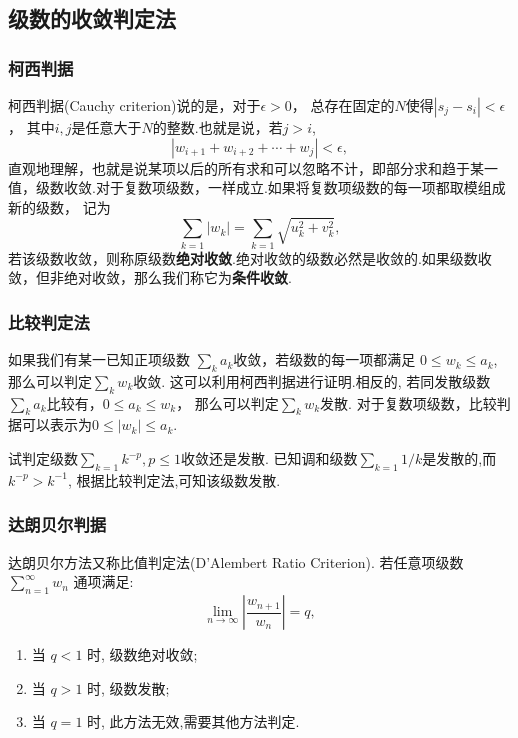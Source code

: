 \subsection{级数的收敛判定法}

\subsubsection{柯西判据}
柯西判据(Cauchy criterion)说的是，对于$\epsilon>0$， 总存在固定的$N$使得$|s_j - s_i|< \epsilon$， 其中$i,j$是任意大于$N$的整数.也就是说，若$j>i$,
\begin{equation}
    | w_{i+1} + w_{i+2} + \cdots + w_{j} | < \epsilon ,
\end{equation}
直观地理解，也就是说某项以后的所有求和可以忽略不计，即部分求和趋于某一值，级数收敛.对于复数项级数，一样成立.如果将复数项级数的每一项都取模组成新的级数，
记为
\begin{equation}
    \sum_{k=1} |w_k| = \sum_{k=1}\sqrt { u_k^2 + v_k^2},
\end{equation}
若该级数收敛，则称原级数\textbf{绝对收敛}.绝对收敛的级数必然是收敛的.如果级数收敛，但非绝对收敛，那么我们称它为\textbf{条件收敛}.
\subsubsection{比较判定法}
如果我们有某一已知正项级数 $\sum_k a_k$收敛，若级数的每一项都满足 $0 \leq w_k \leq a_k$, 那么可以判定$\sum_k w_k$收敛.
这可以利用柯西判据进行证明.相反的, 若同发散级数$\sum_{k} a_k$比较有，$0 \leq a_k  \leq w_k$， 那么可以判定$\sum_k w_k$发散.
对于复数项级数，比较判据可以表示为$0 \leq |w_k| \leq a_k$.

\begin{examplebox}{试判定级数$\sum_{k=1} k^{-p}, p\leq 1$收敛还是发散.}
    已知调和级数$\sum_{k=1}1/k$是发散的,而 $k^{-p} > k^{-1}$, 根据比较判定法,可知该级数发散.
\end{examplebox}

\subsubsection{达朗贝尔判据}
达朗贝尔方法又称比值判定法(D'Alembert Ratio Criterion).
若任意项级数 $\sum_{n=1}^{\infty} w_n$ 通项满足:
$$
\lim _{n \to \infty}\left|\frac{w_{n+1}}{w_n}\right|=q ,
$$
\begin{enumerate}
    \item 当 $q<1$ 时, 级数绝对收敛;
    \item 当 $q>1$ 时, 级数发散;
    \item 当 $q=1$ 时, 此方法无效,需要其他方法判定.
\end{enumerate}

